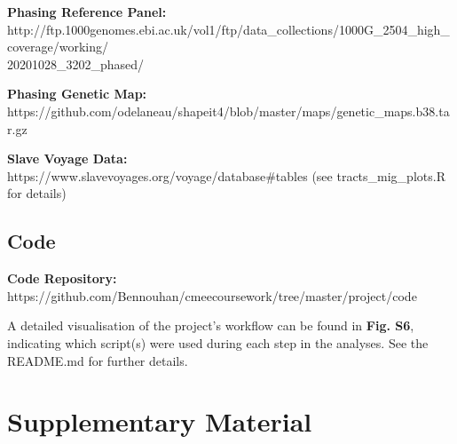 \documentclass[11pt]{article}
\begin{document}
\noindent
\textbf{Phasing Reference Panel:} \\
http://ftp.1000genomes.ebi.ac.uk/vol1/ftp/data\_collections/1000G\_2504\_high\_coverage/working/\\20201028\_3202\_phased/
\vspace{3mm}

\noindent
\textbf{Phasing Genetic Map:} \\
https://github.com/odelaneau/shapeit4/blob/master/maps/genetic\_maps.b38.tar.gz
\vspace{3mm}

\noindent
\textbf{Slave Voyage Data:} \\
https://www.slavevoyages.org/voyage/database\#tables (see tracts\_mig\_plots.R for details)


\vspace{.4cm}
\subsection{Code}

\textbf{Code Repository:} \\
https://github.com/Bennouhan/cmeecoursework/tree/master/project/code


\vspace{4mm}

\noindent
A detailed visualisation of the project's workflow can be found in \textbf{Fig. S6}, indicating which script(s) were used during each step in the analyses. See the README.md for further details.


\newpage
\printbibliography[heading=bibintoc]










\newpage
\section*{Supplementary Material} %
\renewcommand{\thefigure}{S\arabic{figure}}
\setcounter{figure}{0} 
\end{document}
